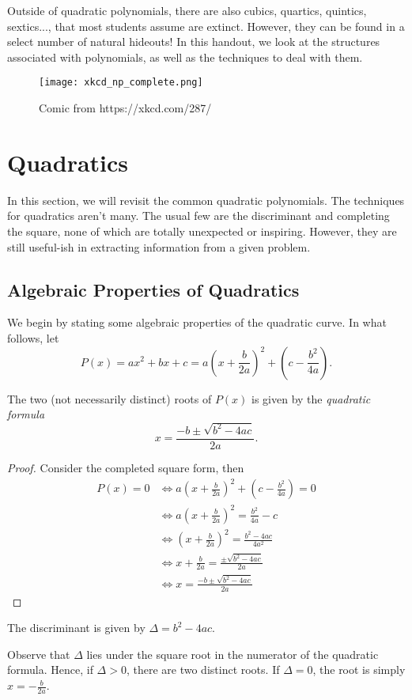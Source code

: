 \documentclass[../jarvis.tex]{subfiles}
\begin{document}
Outside of quadratic polynomials, there are also cubics, quartics, quintics, sextics..., that most students assume are extinct. However, they can be found in a select number of natural hideouts! In this handout, we look at the structures associated with polynomials, as well as the techniques to deal with them. 

\begin{figure}[H]
    \centering
    \texttt{[image: xkcd\_np\_complete.png]}
    \caption{Comic from https://xkcd.com/287/}
\end{figure}
\section{Quadratics \ez}
In this section, we will revisit the common quadratic polynomials.
The techniques for quadratics aren't many. The usual few are the discriminant and completing the square, none of which are totally unexpected or inspiring. However, they are still useful-ish in extracting information from a given problem.

\subsection{Algebraic Properties of Quadratics \ez}
We begin by stating some algebraic properties of the quadratic curve. In what follows, let $$P(x)=ax^2+bx+c=a\left(x+\frac{b}{2a}\right)^2+\left(c-\frac{b^2}{4a}\right).$$
\begin{proposition}
    The two (not necessarily distinct) roots of $P(x)$ is given by the \textit{quadratic formula}
    $$x=\frac{-b\pm\sqrt{b^2-4ac}}{2a}.$$
\end{proposition}
\begin{proof}
    Consider the completed square form, then 
    \begin{align*}
        P(x)=0 &\iff a\left(x+\frac{b}{2a}\right)^2+\left(c-\frac{b^2}{4a}\right)=0 \\
        &\iff a\left(x+\frac{b}{2a}\right)^2=\frac{b^2}{4a}-c \\
        &\iff \left(x+\frac{b}{2a}\right)^2=\frac{b^2-4ac}{4a^2} \\
        &\iff x+\frac{b}{2a}=\frac{\pm\sqrt{b^2-4ac}}{2a} \\
        &\iff x=\frac{-b\pm\sqrt{b^2-4ac}}{2a}
    \end{align*}
\end{proof}
\begin{proposition}[Discriminant]
    The discriminant is given by $\Delta=b^2-4ac$.
\end{proposition}
Observe that $\Delta$ lies under the square root in the numerator of the quadratic formula. Hence, if $\Delta>0$, there are two distinct roots. If $\Delta=0$, the root is simply $x=-\frac{b}{2a}$.
\end{document}

